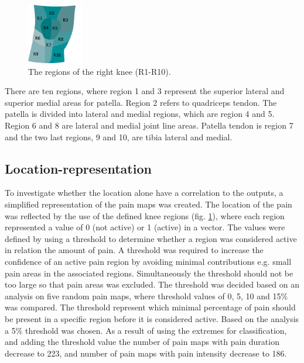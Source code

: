 \begin{figure} [H] 
\centering
\includegraphics[width=0.22\textwidth]{Figures/atlas}
\caption{The regions of the right knee (R1-R10).}
\label{fig:atlas}
\end{figure}

\noindent 
There are ten regions, where region 1 and 3 represent the superior lateral and superior medial areas for patella. Region 2 refers to quadriceps tendon. The patella is divided into lateral and medial regions, which are region 4 and 5. Region 6 and 8 are lateral and medial joint line areas. Patella tendon is region 7 and the two last regions, 9 and 10, are tibia lateral and medial.\citep{Elson2010}

\subsection*{\textbf{Location-representation}} 
To investigate whether the location alone have a correlation to the outputs, a simplified representation of the pain maps was created. The location of the pain was reflected by the use of the defined knee regions (fig. \ref{fig:atlas}), where each region represented a value of 0 (not active) or 1 (active) in a vector.  The values were defined by using a threshold to determine whether a region was considered active in relation the amount of pain. A threshold was required to increase the confidence of an active pain region by avoiding minimal contributions e.g. small pain areas in the associated regions. Simultaneously the threshold should not be too large so that pain areas was excluded. The threshold was decided based on an analysis on five random pain maps, where threshold values of 0, 5, 10 and 15\% was compared. The threshold represent which minimal percentage of pain should be present in a specific region before it is considered active. Based on the analysis a 5\% threshold was chosen. As a result of using the extremes for classification, and adding the threshold value the number of pain maps with pain duration decrease to 223, and number of pain maps with pain intensity decrease to 186.  

